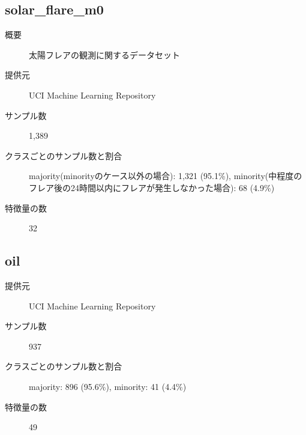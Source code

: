 \subsection{solar\_flare\_m0}
\begin{description}
    \item[概要] 太陽フレアの観測に関するデータセット\cite{solarflare}
    \item[提供元] UCI Machine Learning Repository
    \item[サンプル数] 1,389
    \item[クラスごとのサンプル数と割合] majority(minorityのケース以外の場合): 1,321 (95.1\%), minority(中程度のフレア後の24時間以内にフレアが発生しなかった場合): 68 (4.9\%) 

    \item[特徴量の数] 32
\end{description}

\subsection{oil}
\begin{description}
    \item[提供元] UCI Machine Learning Repository
    \item[サンプル数] 937
    \item[クラスごとのサンプル数と割合] majority: 896 (95.6\%), minority: 41 (4.4\%)

    \item[特徴量の数] 49
        
\end{description}

